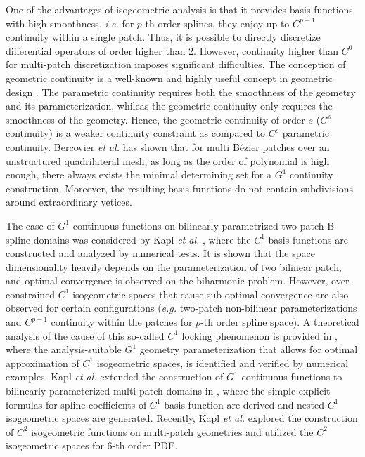 One of the advantages of isogeometric analysis is that it provides basis functions with high smoothness, \textit{i.e.} for $p$-th order splines, they enjoy up to $C^{p-1}$ continuity within a single patch. Thus, it is possible to directly discretize differential operators of order higher than 2. However, continuity higher than $C^0$ for multi-patch discretization imposes significant difficulties. The conception of geometric continuity is a well-known and highly useful concept in geometric design \cite{peters_chapter_2002, peters_joining_1992}. The parametric continuity requires both the smoothness of the geometry and its parameterization, whileas the geometric continuity only requires the smoothness of the geometry. Hence, the geometric continuity of order $s$ ($G^s$ continuity) is a weaker continuity constraint as compared to $C^s$ parametric continuity. Bercovier \textit{et al.} \cite{bercovier_smooth_2014} has shown that for multi B\'ezier patches over an unstructured quadrilateral mesh, as long as the order of polynomial is high enough, there always exists the minimal determining set for a $G^1$ continuity construction. Moreover, the resulting basis functions do not contain subdivisions around extraordinary vetices.\par

The case of $G^1$ continuous functions on bilinearly parametrized two-patch B-spline domains was considered by Kapl \textit{et al.} \cite{kapl_isogeometric_2015}, where the $C^1$ basis functions are constructed and analyzed by numerical tests. It is shown that the space dimensionality heavily depends on the parameterization of two bilinear patch, and optimal convergence is observed on the biharmonic problem. However, over-constrained $C^1$ isogeometric spaces that cause sub-optimal convergence are also observed for certain configurations (\textit{e.g.} two-patch non-bilinear parameterizations and $C^{p-1}$ continuity within the patches for $p$-th order spline space). A theoretical analysis of the cause of this so-called $C^1$ locking phenomenon is provided in \cite{collin_analysis-suitable_2016}, where the analysis-suitable $G^1$ geometry parameterization that allows for optimal approximation of $C^1$ isogeometric spaces, is identified and verified by numerical examples. Kapl \textit{et al.} extended the construction of $G^1$ continuous functions to bilinearly parameterized multi-patch domains in \cite{kapl_isogeometric_2017}, where the simple explicit formulas for spline coefficients of $C^1$ basis function are derived and nested $C^1$ isogeometric spaces are generated. Recently, Kapl \textit{et al.} \cite{kapl_space_2017,kapl_space_nodate} explored the construction of $C^2$ isogeometric functions on multi-patch geometries and utilized the $C^2$ isogeometric spaces for $6$-th order PDE.\par

